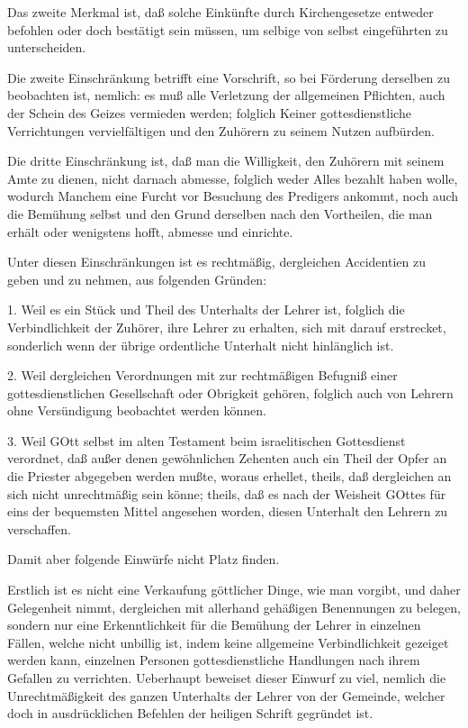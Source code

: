 Das zweite Merkmal ist, daß solche Einkünfte durch Kirchengesetze entweder befohlen oder doch bestätigt sein müssen, um selbige von selbst eingeführten zu unterscheiden.

Die zweite Einschränkung betrifft eine Vorschrift, so bei Förderung derselben zu beobachten ist, nemlich: es muß alle Verletzung der allgemeinen Pflichten, auch der Schein des Geizes vermieden werden; folglich Keiner gottesdienstliche Verrichtungen vervielfältigen und den Zuhörern zu seinem Nutzen aufbürden.

Die dritte Einschränkung ist, daß man die Willigkeit, den Zuhörern mit seinem Amte zu dienen, nicht darnach abmesse, folglich weder Alles bezahlt haben wolle, wodurch Manchem eine Furcht vor Besuchung des Predigers ankommt, noch auch die Bemühung selbst und den Grund derselben nach den Vortheilen,
die man erhält oder wenigstens hofft, abmesse und einrichte.

Unter diesen Einschränkungen ist es rechtmäßig, dergleichen Accidentien zu geben und zu nehmen, aus folgenden Gründen:

1. Weil es ein Stück und Theil des Unterhalts der Lehrer ist, folglich die Verbindlichkeit der Zuhörer, ihre Lehrer zu erhalten, sich mit darauf erstrecket, sonderlich wenn der übrige ordentliche Unterhalt nicht hinlänglich ist.

2. Weil dergleichen Verordnungen mit zur rechtmäßigen Befugniß einer gottesdienstlichen Gesellschaft oder Obrigkeit gehören, folglich auch von Lehrern ohne Versündigung beobachtet werden können.

3. Weil GOtt selbst im alten Testament beim israelitischen Gottesdienst verordnet, daß außer denen gewöhnlichen Zehenten auch ein Theil der Opfer an die Priester abgegeben werden mußte, woraus erhellet, theils, daß dergleichen an sich nicht unrechtmäßig sein könne; theils, daß es nach der Weisheit GOttes für eins der bequemsten Mittel angesehen worden, diesen Unterhalt den Lehrern zu verschaffen.

Damit aber folgende Einwürfe nicht Platz finden.

Erstlich ist es nicht eine Verkaufung göttlicher Dinge, wie man vorgibt, und daher Gelegenheit nimmt, dergleichen mit allerhand gehäßigen Benennungen zu belegen, sondern nur eine Erkenntlichkeit für die Bemühung der Lehrer in einzelnen Fällen, welche nicht unbillig ist, indem keine allgemeine Verbindlichkeit gezeiget werden kann, einzelnen Personen gottesdienstliche Handlungen nach ihrem Gefallen zu verrichten. Ueberhaupt beweiset dieser Einwurf zu viel, nemlich die Unrechtmäßigkeit des ganzen Unterhalts der Lehrer von der Gemeinde, welcher doch in ausdrücklichen Befehlen der heiligen Schrift gegründet ist.

